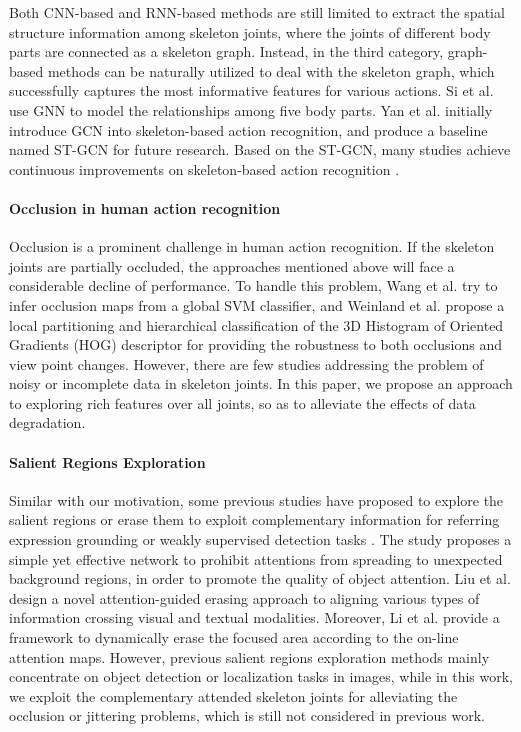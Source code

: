 \documentclass[journal]{IEEEtran}
\begin{document}
Both CNN-based and RNN-based methods are still limited to extract the spatial structure information among skeleton joints, where the joints of different body parts are connected as a skeleton graph. Instead, in the third category, graph-based methods can be naturally utilized to deal with the skeleton graph, which successfully captures the most informative features for various actions. Si et al. \cite{si2018skeleton} use GNN to model the relationships among five body parts. Yan et al. \cite{yan2018spatial} initially introduce GCN into skeleton-based action recognition, and produce a baseline named ST-GCN for future research. Based on the ST-GCN, many studies achieve continuous improvements on skeleton-based action recognition \cite{si2019attention, thakkar2018part, shi2019two}.

\paragraph{Occlusion in human action recognition} Occlusion is a prominent challenge in human action recognition. If the skeleton joints are partially occluded, the approaches mentioned above will face a considerable decline of performance. To handle this problem, Wang et al. \cite{wang2009hog} try to infer occlusion maps from a global SVM classifier, and Weinland et al. \cite{weinland2010making} propose a local partitioning and hierarchical classification of the 3D Histogram of Oriented Gradients (HOG) descriptor for providing the robustness to both occlusions and view point changes. However, there are few studies addressing the problem of noisy or incomplete data in skeleton joints. In this paper, we propose an approach to exploring rich features over all joints, so as to alleviate the effects of data degradation.

\paragraph{Salient Regions Exploration} Similar with our motivation, some previous studies have proposed to explore the salient regions or erase them to exploit complementary information for referring expression grounding \cite{hou2018self, liu2019improving} or weakly supervised detection tasks \cite{li2018tell}. The study \cite{hou2018self} proposes a simple yet effective network to prohibit attentions from spreading to unexpected background regions, in order to promote the quality of object attention. Liu et al. \cite{liu2019improving} design a novel attention-guided erasing approach to aligning various types of information crossing visual and textual modalities. Moreover, Li et al. \cite{li2018tell} provide a framework to dynamically erase the focused area according to the on-line attention maps. However, previous salient regions exploration methods mainly concentrate on object detection or localization tasks in images, while in this work, we exploit the complementary attended skeleton joints for alleviating the occlusion or jittering problems, which is still not considered in previous work.
\end{document}
